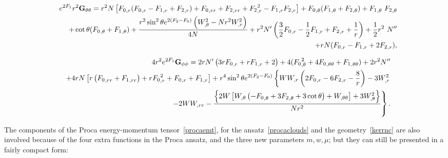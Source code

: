 \begin{eqnarray}
&&  e^{2F_1}r^2{\bf G_{\theta\theta}}=r^2 N\left[ {F_0}_{,r}({F_0}_{,r}- 
{F_1}_{,r}+{F_2}_{,r}) + {F_0}_{,rr}+
{F_2}_{,rr}+ {F_2}_{,r}^2-{F_1}_{,r} {F_2}_{,r} \right]
%
+{F_0}_{,\theta}( {F_1}_{,\theta}+ 
{F_2}_{,\theta})+{F_1}_{,\theta} \
{F_2}_{,\theta}
%
 \nonumber \\
&& +\cot \theta( {F_0}_{,\theta}+ {F_1}_{,\theta})+\frac{r^2 \sin ^2\theta 
 e^{2( {F_2}- {F_0})}\left(W_{,\theta}^2-Nr^2  W_{,r}^2\right)}{4 N}+r^2 N' \left(\frac{3}{2} {F_0}_{,r}-\frac{1}{2}  {F_1}_{,r}+
{F_2}_{,r}+\frac{1}{r}\right)+\frac{1}{2} r^2 \
N''
 \nonumber \\
&&
+r N(
{F_0}_{,r}-
{F_1}_{,r}+2 {F_2}_{,r}),
\end{eqnarray}



\begin{eqnarray}
&& 4r^2e^{2F_1}{\bf G_{\phi\phi}}= 2 r N'  \left(3 r {F_0}_{,r}+r 
{F_1}_{,r}+2\right)+4 (
{F_0}_{,\theta}^2  +4{F_0}_{,\theta\theta}+ {F_1}_{,\theta\theta}) +2 r^2 N''  \nonumber \\
%
&& 
%
+4 r N  \left[r \left({F_0}_{,rr}+{F_1}_{,rr}\right)+r 
{F_0}_{,r}^2+{F_0}_{,r}+{F_1}_{,r}\right] +r^4 \sin ^2\theta e^{2 ({F_2}-F_0)}\left\{ W W_{,r}\left(2  {F_0}_{,r}-6 {F_2}_{,r}-\frac{8}{r}\right)-3  W_{,r}^2\right. \nonumber \\
%
&&
\left.-2 WW_{,rr}- \frac{\left\{2 W \left[W_{,\theta} \left(- {F_0}_{,\theta}
+3 {F_2}_{,\theta}+3 \cot \theta\right)+ W_{,\theta\theta}\right]+3 W_{,\theta}^2\right\}}{Nr^2}\right\} .
\end{eqnarray}






The components of the Proca energy-momentum tensor~\eqref{procaemt}, for the ansatz~\eqref{procaclouds} and the geometry~\eqref{kerrnc} are also involved because of the four extra functions in the Proca ansatz, and the three new parameters $m,w,\mu$; but they can still be presented in a fairly compact form:

